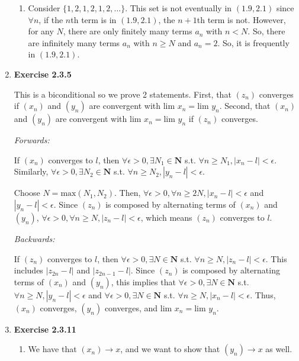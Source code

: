 \documentclass{article}
\begin{document}
\begin{enumerate}
\begin{enumerate}
            \item Consider $\{1, 2, 1, 2, 1, 2, \dots\}$. This set is not eventually in $(1.9, 2.1)$ since $\forall n$, if the $n$th term is in $(1.9, 2.1)$, the $n+1$th term is not. However, for any $N$, there are only finitely many terms $a_n$ with $n < N$. So, there are infinitely many terms $a_n$ with $n \geq N$ and $a_n = 2$. So, it is frequently in $(1.9, 2.1)$.
        \end{enumerate}
        
    \item \textbf{Exercise 2.3.5}

        This is a biconditional so we prove 2 statements. First, that $(z_n)$ converges if $(x_n)$ and $(y_n)$ are convergent with $\text{lim }x_n = \text{lim }y_n$. Second, that $(x_n)$ and $(y_n)$ are convergent with $\text{lim }x_n = \text{lim }y_n$ if $(z_n)$ converges. 

        \textit{Forwards: }

        If $(x_n)$ converges to $l$, then $\forall \epsilon > 0, \exists N_1 \in \mathbf{N}$ s.t. $\forall n \geq N_1, |x_n - l| < \epsilon$. Similarly, $\forall \epsilon > 0, \exists N_2 \in \mathbf{N}$ s.t. $\forall n \geq N_2, |y_n - l| < \epsilon$.

        Choose $N = \text{max}(N_1, N_2)$. Then, $\forall \epsilon > 0, \forall n \geq 2N, |x_n - l| < \epsilon$ and $|y_n - l| < \epsilon$. Since $(z_n)$ is composed by alternating terms of $(x_n)$ and $(y_n)$, $\forall \epsilon > 0, \forall n \geq N, |z_n - l| < \epsilon$, which means $(z_n)$ converges to $l$. 

        \textit{Backwards: }

        If $(z_n)$ converges to $l$, then $\forall \epsilon > 0, \exists N \in \mathbf{N}$ s.t. $\forall n \geq N, |z_n - l| < \epsilon$. This includes $|z_{2n} - l|$ and $|z_{2n-1} - l|$. Since $(z_n)$ is composed by alternating terms of $(x_n)$ and $(y_n)$, this implies that $\forall \epsilon > 0, \exists N \in \mathbf{N}$ s.t. $\forall n \geq N, |y_n - l| < \epsilon$ and $\forall \epsilon > 0, \exists N \in \mathbf{N}$ s.t. $\forall n \geq N, |x_n - l| < \epsilon$. Thus, $(x_n)$ converges, $(y_n)$ converges, and $\text{lim }x_n = \text{lim }y_n$.
        
    \item \textbf{Exercise 2.3.11}
        \begin{enumerate}
            \item We have that $(x_n) \rightarrow x$, and we want to show that $(y_n) \rightarrow x$ as well. 


\end{enumerate}
\end{enumerate}
\end{document}
